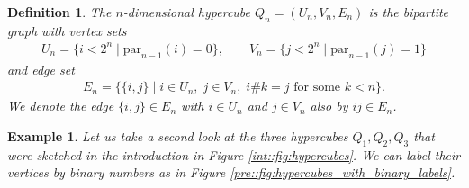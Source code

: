 \documentclass[a4paper]{amsart}
\newtheorem{definition}[thm]{Definition}
\newtheorem{example}[thm]{Example}
\begin{document}
\begin{definition}
    The $n$-dimensional hypercube $Q_n = (U_n, V_n, E_n)$ is the bipartite graph with vertex sets
    \begin{align*}
        U_n = \{i < 2^n \mid \mathrm{par}_{n-1}(i) = 0\}, \qquad
        V_n = \{j < 2^n \mid \mathrm{par}_{n-1}(j) = 1\}
    \end{align*}
    and edge set
    \begin{align*}
        E_{n} = \{ \{i,j\} \mid i \in U_n, \; j \in V_n, \; i \# k = j \text{ for some } k < n\}.
    \end{align*}
    We denote the edge $\{i,j\} \in E_{n}$ with $i \in U_n$ and $j \in V_n$ also by $ij \in E_{n}$.
\end{definition}

\begin{example}
    Let us take a second look at the three hypercubes $Q_1, Q_2, Q_3$ that were sketched in the introduction in Figure \ref{int::fig:hypercubes}. We can label their vertices by binary numbers as in Figure \ref{pre::fig:hypercubes_with_binary_labels}.
    \begin{figure}[htbp]
    \centering
\end{figure}
\end{example}
\end{document}

